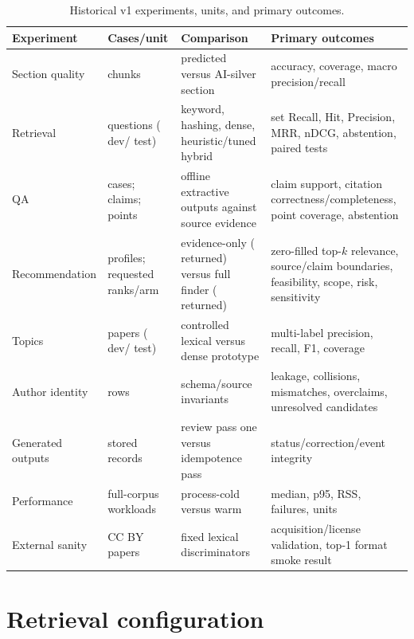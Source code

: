 \begin{table}[htbp]
\centering
\small
\caption{Historical v1 experiments, units, and primary outcomes.}
\label{tab:experiment-inventory}
\begin{tabularx}{\textwidth}{P{31mm}P{31mm}P{35mm}Y}
\toprule
Experiment & Cases/unit & Comparison & Primary outcomes \\
\midrule
Section quality & \SectionSilverCaseCount{} chunks & predicted versus AI-silver section & accuracy, coverage, macro precision/recall \\
Retrieval & \RetrievalCaseCount{} questions (\RetrievalDevCount{} dev/\RetrievalTestCount{} test) & keyword, hashing, dense, heuristic/tuned hybrid & set Recall, Hit, Precision, MRR, nDCG, abstention, paired tests \\
QA & \QaCaseCount{} cases; \QaClaimCount{} claims; \QaAnswerPointCount{} points & offline extractive outputs against source evidence & claim support, citation correctness/completeness, point coverage, abstention \\
Recommendation & \RecommendationProfileCount{} profiles; \RecommendationRequestedSlotCount{} requested ranks/arm & evidence-only (\RecommendationEvidenceReturnedCount{} returned) versus full finder (\RecommendationFullReturnedCount{} returned) & zero-filled top-$k$ relevance, source/claim boundaries, feasibility, scope, risk, sensitivity \\
Topics & \TopicCaseCount{} papers (\TopicDevCount{} dev/\TopicTestCount{} test) & controlled lexical versus dense prototype & multi-label precision, recall, F1, coverage \\
Author identity & \RawAuthorRowCount{} rows & schema/source invariants & leakage, collisions, mismatches, overclaims, unresolved candidates \\
Generated outputs & \GeneratedReviewTotalCount{} stored records & review pass one versus idempotence pass & status/correction/event integrity \\
Performance & full-corpus workloads & process-cold versus warm & median, p95, RSS, failures, units \\
External sanity & \ExternalSanityDocumentCount{} CC BY papers & fixed lexical discriminators & acquisition/license validation, top-1 format smoke result \\
\bottomrule
\end{tabularx}
\end{table}

\section{Retrieval configuration}

